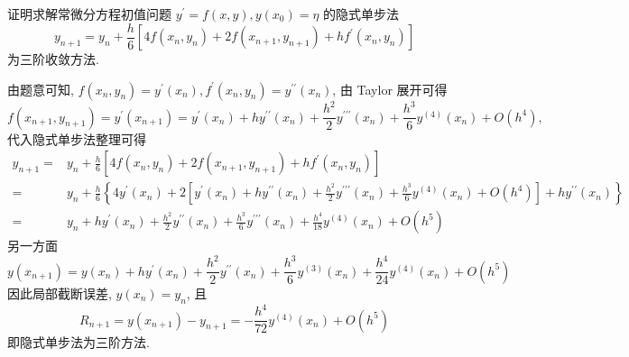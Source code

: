     \begin{tcolorbox}[enhanced,colback=8,colframe=7,breakable,coltitle=green!25!black,title=2024]
证明求解常微分方程初值问题 $ y^{\prime}=f(x, y), y\left(x_{0}\right)=\eta $ 的隐式单步法
$$
y_{n+1}=y_{n}+\frac{h}{6}\left[4 f\left(x_{n}, y_{n}\right)+2 f\left(x_{n+1}, y_{n+1}\right)+h f^{\prime}\left(x_{n}, y_{n}\right)\right]
$$
为三阶收敛方法.
 \tcblower

 由题意可知, $ f\left(x_{n}, y_{n}\right)=y^{\prime}\left(x_{n}\right), f^{\prime}\left(x_{n}, y_{n}\right)=y^{\prime \prime}\left(x_{n}\right) $, 由 Taylor 展开可得
$$
f\left(x_{n+1}, y_{n+1}\right)=y^{\prime}\left(x_{n+1}\right)=y^{\prime}\left(x_{n}\right)+h y^{\prime \prime}\left(x_{n}\right)+\frac{h^{2}}{2} y^{\prime \prime \prime}\left(x_{n}\right)+\frac{h^{3}}{6} y^{(4)}\left(x_{n}\right)+O\left(h^{4}\right) \text {, }
$$
代入隐式单步法整理可得
$$
\begin{aligned}
y_{n+1}= & y_{n}+\frac{h}{6}\left[4 f\left(x_{n}, y_{n}\right)+2 f\left(x_{n+1}, y_{n+1}\right)+h f^{\prime}\left(x_{n}, y_{n}\right)\right] \\
= & y_{n}+\frac{h}{6}\left\{4 y^{\prime}\left(x_{n}\right)+2\left[y^{\prime}\left(x_{n}\right)+h y^{\prime \prime}\left(x_{n}\right)+\frac{h^{2}}{2} y^{\prime \prime \prime}\left(x_{n}\right)+\frac{h^{3}}{6} y^{(4)}\left(x_{n}\right)+O\left(h^{4}\right)\right]+h y^{\prime \prime}\left(x_{n}\right)\right\} \\
= & y_{n}+h y^{\prime}\left(x_{n}\right)+\frac{h^{2}}{2} y^{\prime \prime}\left(x_{n}\right)+\frac{h^{3}}{6} y^{\prime \prime \prime}\left(x_{n}\right)+\frac{h^{4}}{18} y^{(4)}\left(x_{n}\right)+O\left(h^{5}\right)
\end{aligned}
$$
另一方面
$$
y\left(x_{n+1}\right)=y\left(x_{n}\right)+h y^{\prime}\left(x_{n}\right)+\frac{h^{2}}{2} y^{\prime \prime}\left(x_{n}\right)+\frac{h^{3}}{6} y^{(3)}\left(x_{n}\right)+\frac{h^{4}}{24} y^{(4)}\left(x_{n}\right)+O\left(h^{5}\right)
$$
因此局部截断误差, $ y\left(x_{n}\right)=y_{n} $, 且
$$
R_{n+1}=y\left(x_{n+1}\right)-y_{n+1}=-\frac{h^{4}}{72} y^{(4)}\left(x_{n}\right)+O\left(h^{5}\right)
$$
即隐式单步法为三阶方法.

 \end{tcolorbox}

